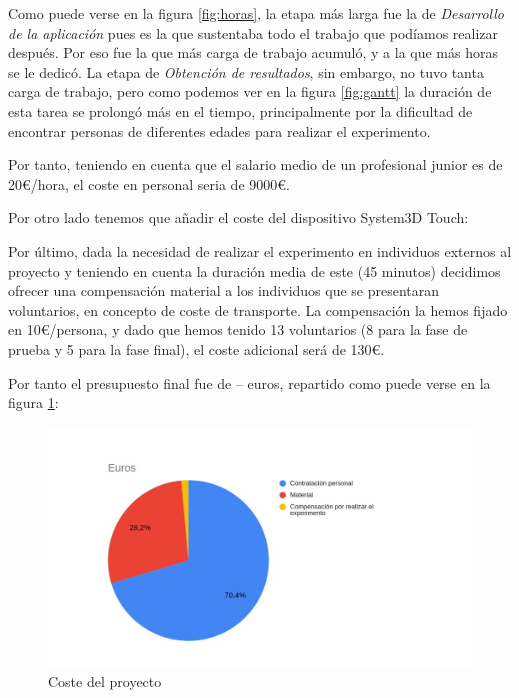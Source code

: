 \documentclass[a4paper,11pt, oneside]{book}
\begin{document}
Como puede verse en la figura \ref{fig:horas}, la etapa más larga fue la de \textit{Desarrollo de la aplicación} pues es la que sustentaba todo el trabajo que podíamos realizar después. Por eso fue la que más carga de trabajo acumuló, y a la que más horas se le dedicó. La etapa de \textit{Obtención de resultados}, sin embargo, no tuvo tanta carga de trabajo, pero como podemos ver en la figura \ref{fig:gantt} la duración de esta tarea se prolongó más en el tiempo, principalmente por la dificultad de encontrar personas de diferentes edades para realizar el experimento.


Por tanto, teniendo en cuenta que el salario medio de un profesional junior es de 20\euro /hora, el coste en personal seria de 9000\euro.

Por otro lado tenemos que añadir el coste del dispositivo System3D Touch: 

Por último, dada la necesidad de realizar el experimento en individuos externos al proyecto y teniendo en cuenta la duración media de este (45 minutos) decidimos ofrecer una compensación material a los individuos que se presentaran voluntarios, en concepto de coste de transporte. La compensación la hemos fijado en 10\euro /persona, y dado que hemos tenido 13 voluntarios (8 para la fase de prueba y 5 para la fase final), el coste adicional será de 130\euro.

Por tanto el presupuesto final fue de -- euros, repartido como puede verse en la figura \ref{fig:coste}:

\begin{figure}[H]
	
	\centering
	\includegraphics[width=\linewidth]{coste}
	\caption{Coste del proyecto}
	\label{fig:coste}
	
\end{figure}
\end{document}
